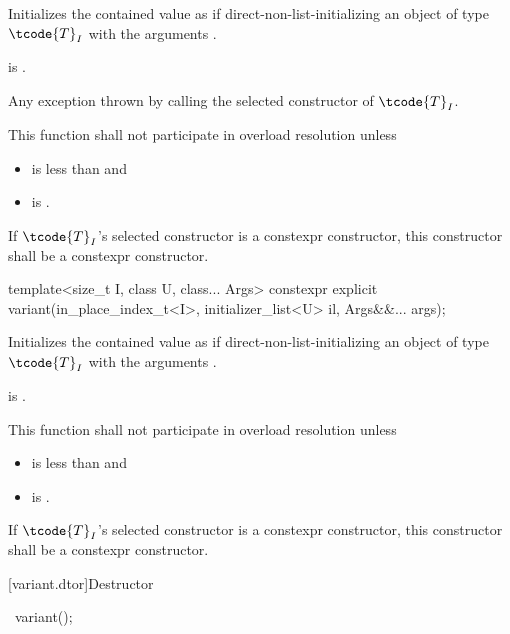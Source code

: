 \begin{itemdescr}
\pnum
\effects
Initializes the contained value as if direct-non-list-initializing
an object of type $\tcode{T}_I$
with the arguments .

\pnum
\ensures
{} is .

\pnum
\throws
Any exception thrown by calling the selected constructor of $\tcode{T}_I$.

\pnum
\remarks
This function shall not participate in overload resolution unless
\begin{itemize}
\item
{} is less than  and
\item
{} is .
\end{itemize}
If $\tcode{T}_I$'s selected constructor is a constexpr constructor, this
constructor shall be a constexpr constructor.
\end{itemdescr}

%
\begin{itemdecl}
template<size_t I, class U, class... Args>
  constexpr explicit variant(in_place_index_t<I>, initializer_list<U> il, Args&&... args);
\end{itemdecl}

\begin{itemdescr}
\pnum
\effects
Initializes the contained value as if direct-non-list-initializing
an object of type $\tcode{T}_I$
with the arguments .

\pnum
\ensures
{} is .

\pnum
\remarks
This function shall not participate in overload resolution unless
\begin{itemize}
\item
{} is less than  and
\item
{} is .
\end{itemize}
If $\tcode{T}_I$'s selected constructor is a constexpr constructor, this
constructor shall be a constexpr constructor.
\end{itemdescr}

[variant.dtor]{Destructor}

%
\begin{itemdecl}
~variant();
\end{itemdecl}


